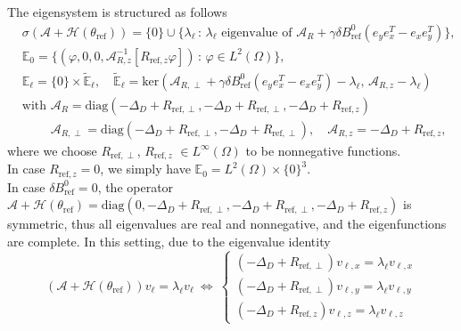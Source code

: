 \documentclass[12pt]{article}
\newcommand\calA{\mathcal{A}}
\newcommand\HH{\mathcal{H}}
\begin{document}
The eigensystem is structured as follows
\begin{equation}\label{eigensystemBT}
\begin{aligned}
&\sigma(\calA+\HH(\theta_{\text{ref}}))=\{0\}\cup\{\lambda_\ell \, :\, \lambda_{\ell}\text{ eigenvalue of }\calA_R
+\gamma\delta B^0_{\text{ref}} (e_ye_x^T-e_xe_y^T)\}, \\ 
&\mathbb{E}_0 = \{(\varphi,0,0, \calA_{R,z}^{-1}[R_{\text{ref},z}\varphi])\, :\,\varphi\in L^2(\Omega)\},
\\ 
&\mathbb{E}_\ell = \{0\}\times\tilde{\mathbb{E}}_{\ell}, \quad
\tilde{\mathbb{E}}_{\ell}
=\text{ker}(\calA_{R,\perp}+\gamma\delta B^0_{\text{ref}} (e_ye_x^T-e_xe_y^T)-\lambda_\ell,\,\calA_{R,z}-\lambda_\ell)\\
&\text{with }\calA_R
=\text{diag}(-\Delta_D+R_{\text{ref},\perp},-\Delta_D+R_{\text{ref},\perp},-\Delta_D+R_{\text{ref},z})\\
&\phantom{\text{with }}
\calA_{R,\perp}=\text{diag}(-\Delta_D+R_{\text{ref},\perp},-\Delta_D+R_{\text{ref},\perp}),\quad
\calA_{R,z}=-\Delta_D+R_{\text{ref},z}, 
\end{aligned}
\end{equation}
where we choose $R_{\text{ref},\perp}$, $R_{\text{ref},z}$ $\in L^\infty(\Omega)$ to be nonnegative functions.
\\
In case $R_{\text{ref},z}=0$, we simply have $\mathbb{E}_0 = L^2(\Omega)\times\{0\}^3$.
\\
In case $\delta B^0_{\text{ref}}=0$, the operator $\calA+\HH(\theta_{\text{ref}})=\text{diag}(0,-\Delta_D+R_{\text{ref},\perp},-\Delta_D+R_{\text{ref},\perp},-\Delta_D+R_{\text{ref},z})$ is symmetric, thus all eigenvalues are real and nonnegative, and the eigenfunctions are complete.
In this setting, due to the eigenvalue identity
\begin{equation}\label{eigvaleq}
(\calA+\HH(\theta_{\text{ref}})) v_\ell =\lambda_\ell v_\ell \ \Leftrightarrow \
\begin{cases}
(-\Delta_D+R_{\text{ref},\perp})v_{\ell,x}=\lambda_\ell v_{\ell,x}\\
(-\Delta_D+R_{\text{ref},\perp})v_{\ell,y}=\lambda_\ell v_{\ell,y}\\
(-\Delta_D+R_{\text{ref},z})v_{\ell,z}=\lambda_\ell v_{\ell,z}
\end{cases}
\end{equation}
\end{document}
